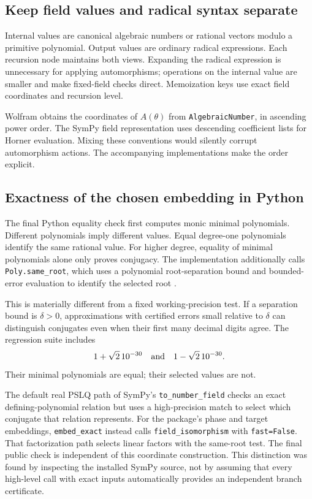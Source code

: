\documentclass[11pt,letterpaper]{article}
\newcommand{\code}[1]{\texttt{#1}}
\theoremstyle{definition}\newtheorem{definition}[theorem]{Definition}
\theoremstyle{remark}\newtheorem{remark}[theorem]{Remark}
\begin{document}
\subsection{Keep field values and radical syntax separate}

Internal values are canonical algebraic numbers or rational vectors modulo
a primitive polynomial. Output values are ordinary radical expressions.
Each recursion node maintains both views. Expanding the radical expression
is unnecessary for applying automorphisms; operations on the internal value
are smaller and make fixed-field checks direct. Memoization keys use exact
field coordinates and recursion level.

Wolfram obtains the coordinates of \(A(\theta)\) from \code{AlgebraicNumber},
in ascending power order. The SymPy field representation uses
descending coefficient lists for Horner evaluation. Mixing these conventions
would silently corrupt automorphism actions. The accompanying implementations
make the order explicit.

\subsection{Exactness of the chosen embedding in Python}

The final Python equality check first computes monic minimal polynomials.
Different polynomials imply different values. Equal degree-one polynomials
identify the same rational value. For higher degree, equality of minimal
polynomials alone only proves conjugacy. The implementation additionally
calls \code{Poly.same\_root}, which uses a polynomial root-separation bound
and bounded-error evaluation to identify the selected root
\cite{sympyreference,sympysource}.

This is materially different from a fixed working-precision test. If a
separation bound is \(\delta>0\), approximations with certified errors small
relative to \(\delta\) can distinguish conjugates even when their first many
decimal digits agree. The regression suite includes
\[
        1+\sqrt2\,10^{-30}\quad\hbox{and}\quad1-\sqrt2\,10^{-30}.
\]
Their minimal polynomials are equal; their selected values are not.

The default real PSLQ path of SymPy's \code{to\_number\_field} checks an
exact defining-polynomial relation but uses a high-precision match to select
which conjugate that relation represents. For the package's phase and target
embeddings, \code{embed\_exact} instead calls
\code{field\_isomorphism} with \code{fast=False}. That factorization path selects
linear factors with the same-root test. The final public check is independent
of this coordinate construction. This distinction was found by inspecting
the installed SymPy source, not by assuming that every high-level call with
exact inputs automatically provides an independent branch certificate.
\end{document}
